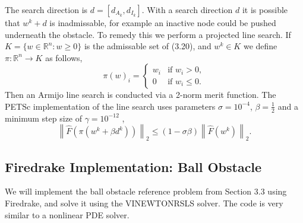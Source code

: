 \documentclass[12 pt]{report}
\newcommand{\RR}{\mathbb{R}}
\newcommand{\norm}[2]{\left \lVert #1 \right \rVert_{#2}}
\begin{document}
The search direction is $d = [d_{A_k}, d_{I_k}]$. With a search direction $d$ it is possible that $w^k + d$ is inadmissable, for example an inactive node could be pushed underneath the obstacle. To remedy this we perform a projected line search. If $K = \{w \in \RR^n: w \geq 0\}$ is the admissable set of (3.20), and $w^k \in K$ we define $\pi: \RR^n \to K$ as follows, 
\begin{equation}
  \pi(w)_i = \begin{cases}
    w_i & \text{if } w_i > 0,\\
    0 & \text{if } w_i \leq 0.
  \end{cases}
\end{equation}
Then an Armijo line search \citep{armijo_minimization_1966} is conducted via a 2-norm merit function. The PETSc implementation of the line search uses parameters $\sigma = 10^{-4}$, $\beta = \frac{1}{2}$ and a minimum step size of $\gamma = 10^{-12}$ \citep[page 8]{benson_flexible_2003},
\begin{equation}
  \norm{\hat{F}(\pi(w^k + \beta d^k))}{2} \leq (1 - \sigma \beta)\norm{\hat{F}(w^k)}{2}.
\end{equation}


\subsection{Firedrake Implementation: Ball Obstacle}
We will implement the ball obstacle reference problem from Section 3.3 using Firedrake, and solve it using the VINEWTONRSLS solver. The code is very similar to a nonlinear PDE solver. 
\end{document}
